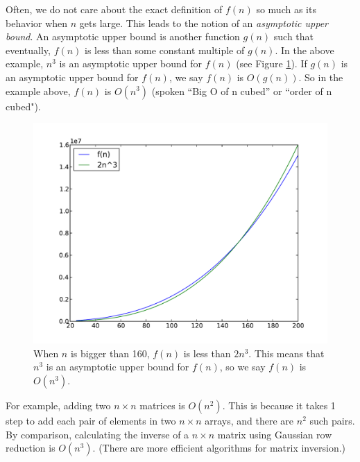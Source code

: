 Often, we do not care about the exact definition of $f(n)$ so much as its behavior when $n$ gets large. 
This leads to the notion of an \emph{asymptotic upper bound}. 
An asymptotic upper bound is another function $g(n)$ such that eventually, $f(n)$ is less than some constant multiple of $g(n)$. 
In the above example, $n^3$ is an asymptotic upper bound for $f(n)$ (see Figure \ref{fig:asymp_upper_bound}). 
If $g(n)$ is an asymptotic upper bound for $f(n)$, we say $f(n)$ is $O(g(n))$. 
So in the example above, $f(n)$ is $O(n^3)$ (spoken ``Big O of n cubed'' or ``order of n cubed").

\begin{figure}
\centering
\includegraphics[width=\textwidth]{asymp_upper_bound.pdf}
\caption{When $n$ is bigger than 160, $f(n)$ is less than $2n^3$. This means that $n^3$ is an asymptotic upper bound for $f(n)$, so we say $f(n)$ is $O(n^3)$.}
\label{fig:asymp_upper_bound}
\end{figure}

For example, adding two $n \times n$ matrices is $O(n^2)$. 
This is because it takes 1 step to add each pair of elements in two $n \times n$ arrays, and there are $n^2$ such pairs.
By comparison, calculating the inverse of a $n \times n$ matrix using Gaussian row reduction is $O(n^3)$. 
(There are more efficient algorithms for matrix inversion.)

